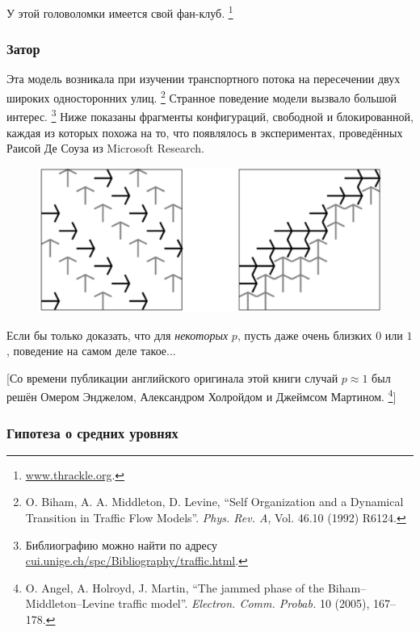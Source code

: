 У этой головоломки имеется свой фан-клуб.%
\footnote{\href{http://www.thrackle.org}{\url{www.thrackle.org}}.}

\subsubsection*{Затор}

Эта модель возникала при изучении транспортного потока на пересечении двух широких односторонних улиц.%
\footnote{O. Biham, A. A. Middleton, D. Levine, ``Self Organization and a Dynamical Transition in Traffic Flow Models''. \emph{Phys. Rev. A}, Vol. 46.10 (1992) R6124.}
Странное поведение модели вызвало большой интерес.%
\footnote{Библиографию можно найти по адресу \href{http://cui.unige.ch/spc/Bibliography/traffic.html.}{\url{cui.unige.ch/spc/Bibliography/traffic.html}}.}
Ниже показаны фрагменты конфигураций, свободной и блокированной, каждая из которых похожа на то, что появлялось в экспериментах, проведённых Раисой Де Соуза из Microsoft Research.

\begin{figure}[h!]
\centering
\includegraphics[scale=0.5]{Figs/UnsolvedPuzzles/gridlock}
\end{figure}

Если бы только доказать, что для \emph{некоторых} $p$, пусть даже очень близких $0$ или $1$, поведение на самом деле такое...

[Со времени публикации английского оригинала этой книги случай $p\approx 1$ был решён Омером Энджелом,
Александром Холройдом и Джеймсом Мартином.
\footnote{O. Angel, A. Holroyd, J. Martin, 
``The jammed phase of the Biham--Middleton--Levine traffic model''.
\emph{Electron. Comm. Probab.} 10 (2005), 167--178.}]

\subsubsection*{Гипотеза о средних уровнях}

